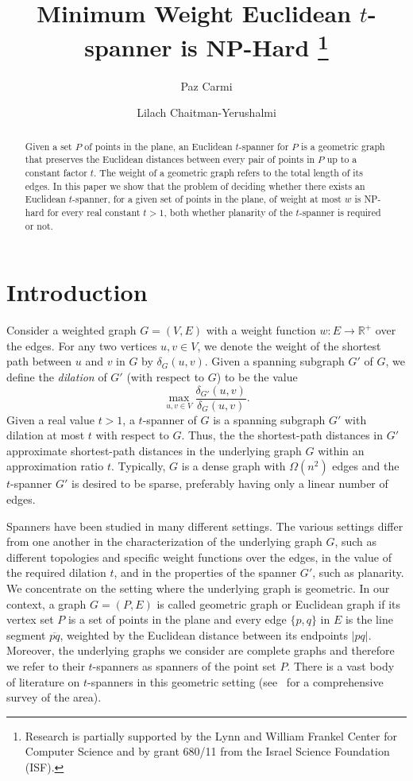 \documentclass[a4paper]{llncs}
\title{ Minimum Weight Euclidean $t$-spanner is NP-Hard
\thanks{Research is partially supported by the Lynn and William Frankel
Center for Computer Science and by
grant 680/11 from the Israel Science Foundation (ISF). }}
\author{Paz Carmi \and Lilach Chaitman-Yerushalmi}
\institute{ Department of Computer Science,\\ Ben-Gurion University of the Negev, Israel}
\begin{document}
\maketitle



\begin{abstract}

Given a set $P$ of points in the plane, an Euclidean $t$-spanner for $P$ is a 
geometric graph that preserves the Euclidean distances between 
every pair of points in $P$ up to a constant factor $t$.
The weight of a geometric graph refers to the total length of its edges.
In this paper we show that the problem of deciding whether there exists 
an Euclidean $t$-spanner, for a given set of points in the plane, of weight at most $w$ is NP-hard
for every real constant $t>1$, both whether planarity of the $t$-spanner is required or not. 
 

\end{abstract}

\section{Introduction}\label{sec:Intro}



Consider a weighted graph $G=(V,E)$ with a weight function $w:E \rightarrow \mathds{R}^+$ over the edges.
For any two vertices $u,v \in V$, we denote the weight of the shortest path between $u$ and $v$ in $G$ by $\delta_G(u,v)$.
Given a spanning subgraph $G'$ of $G$, we define the \emph{dilation} of $G'$ (with respect to $G$) to be the value
$$ \max_{u,v \in V} \frac{\delta_{G'}(u,v)}{\delta_{G}(u,v)}.$$
Given a real value $t> 1$, a $t$-spanner of $G$ is a spanning subgraph $G'$ 
with dilation at most $t$ with respect to $G$.
Thus, the the shortest-path distances in $G'$ approximate shortest-path distances
in the underlying graph $G$ within an approximation ratio $t$.
Typically, $G$ is a dense graph with $\Omega(n^2)$ edges and 
the $t$-spanner $G'$ is desired to be sparse, preferably having only a linear number
of edges.



Spanners have been studied in many different settings. 
The various settings differ from one another in the characterization of the underlying graph $G$,
such as different topologies and specific weight functions over the edges,  
in the value of the required dilation $t$, and in the properties of the spanner $G'$, such as planarity.
We concentrate on the setting where the underlying graph is geometric.
In our context, a graph $G=(P,E)$ is called geometric graph or Euclidean graph
if its vertex set $P$ is a set of points in the plane 
and every edge $\{p,q\}$ in $E$ is the line segment $\overline{pq}$, 
weighted by the Euclidean distance between its endpoints $|pq|$.
Moreover, the underlying graphs we consider are complete graphs
and therefore we refer to their $t$-spanners as spanners of the point set $P$.
There is a vast body of literature on $t$-spanners in this geometric setting 
(see~\cite{GiriSmid07} for a comprehensive survey of the area).
\end{document}
